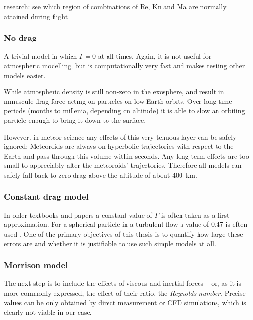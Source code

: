         research: see which region of combinations of Re, Kn and Ma are normally attained during flight

        \subsubsection{No drag} \label{fdmn}
            A trivial model in which $\Gamma = 0$ at all times.
            Again, it is not useful for atmospheric modelling, but is computationally
            very fast and makes testing other models easier.

            While atmospheric density is still non-zero in the exosphere,
            and result in minuscule drag force acting on particles on low-Earth orbits.
            Over long time periods (months to millenia, depending on altitude) it is able to slow
            an orbiting particle enough to bring it down to the surface.

            However, in meteor science any effects of this very tenuous layer can be safely ignored:
            Meteoroids are always on hyperbolic trajectories with respect to the Earth
            and pass through this volume within seconds. Any long-term effects
            are too small to appreciably alter the meteoroids' trajectories.
            Therefore all models can safely fall back to zero drag above the
            altitude of about \SI{400}{\kilo\metre}.

        \subsubsection{Constant drag model} \label{fdmc}
            In older textbooks and papers a constant value of $\Gamma$ is often taken as a first approximation.
            For a spherical particle in a turbulent flow a value of \num{0.47} is often used \cite{???}.
            One of the primary objectives of this thesis is to quantify how large these errors
            are and whether it is justifiable to use such simple models at all.

        \subsubsection{Morrison model} \label{fdmM}
            The next step is to include the effects of viscous and inertial forces -- or,
            as it is more commonly expressed, the effect of their ratio, the \emph{Reynolds number}.
            Precise values can be only obtained by direct measurement or CFD simulations,
            which is clearly not viable in our case.

